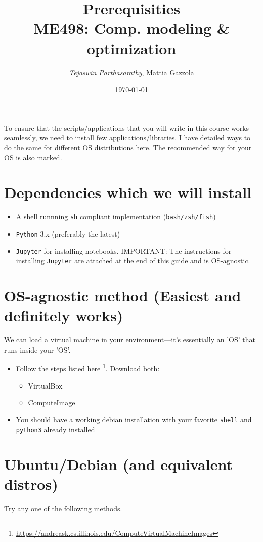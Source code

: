 \documentclass[11pt]{article}
\author{\emph{Tejaswin Parthasarathy}, Mattia Gazzola}
\date{\today}
\title{Prerequisities\\\medskip
\large ME498: Comp. modeling \& optimization}
\begin{document}
\maketitle
To ensure that the scripts/applications that you will write in this course works
seamlessly, we need to install few applications/libraries. I have detailed ways
to do the same for different OS distributions here. The recommended way for your
OS is also marked.

\section*{Dependencies which we will install}
\label{sec:org62694cd}
\begin{itemize}
\item A shell runnning \texttt{sh} compliant implementation (\texttt{bash/zsh/fish})
\item \texttt{Python} 3.x (preferably the latest)
\item \texttt{Jupyter} for installing notebooks. IMPORTANT: The instructions for installing
\texttt{Jupyter} are attached at the end of this guide and is OS-agnostic.
\end{itemize}

\section*{OS-agnostic method (Easiest and definitely works)}
\label{sec:orge437b40}
We can load a virtual machine in your environment---it's essentially an 'OS' that
runs inside your 'OS'.
\begin{itemize}
\item Follow the steps \href{https://andreask.cs.illinois.edu/ComputeVirtualMachineImages}{listed here} \footnote{\url{https://andreask.cs.illinois.edu/ComputeVirtualMachineImages}}. Download both:
\label{sec:orgd4b054b}
\begin{itemize}
\item VirtualBox
\label{sec:orgae38ae7}
\item ComputeImage
\label{sec:org45e97f0}
\end{itemize}
\item You should have a working debian installation with your favorite
\label{sec:org2b88e1d}
\texttt{shell} and \texttt{python3} already installed
\end{itemize}

\section*{Ubuntu/Debian (and equivalent distros)}
\label{sec:org00b2d42}
Try any one of the following methods.
\end{document}
